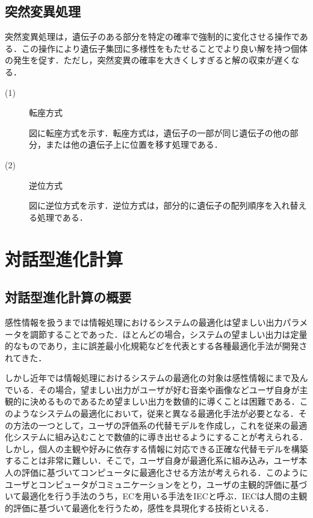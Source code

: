 \newpage


\subsection{突然変異処理}
\label{sec2.1.5}

突然変異処理は，遺伝子のある部分を特定の確率で強制的に変化させる操作である．この操作により遺伝子集団に多様性をもたせることでより良い解を持つ個体の発生を促す．ただし，突然変異の確率を大きくしすぎると解の収束が遅くなる．

\begin{description}

\item[ (1) ]転座方式

図に転座方式を示す．転座方式は，遺伝子の一部が同じ遺伝子の他の部分，または他の遺伝子上に位置を移す処理である．

\item[ (2) ]逆位方式


図に逆位方式を示す．逆位方式は，部分的に遺伝子の配列順序を入れ替える処理である．


\end{description}


\newpage

\section{対話型進化計算}
\label{sec2.2}

\subsection{対話型進化計算の概要}
\label{sec2.2.1}

感性情報を扱うまでは情報処理におけるシステムの最適化は望ましい出力パラメータを調節することであった．ほとんどの場合，システムの望ましい出力は定量的なものであり，主に誤差最小化規範などを代表とする各種最適化手法が開発されてきた．

しかし近年では情報処理におけるシステムの最適化の対象は感性情報にまで及んでいる．その場合，望ましい出力がユーザが好む音楽や画像などユーザ自身が主観的に決めるものであるため望ましい出力を数値的に導くことは困難である．このようなシステムの最適化において，従来と異なる最適化手法が必要となる．その方法の一つとして，ユーザの評価系の代替モデルを作成し，これを従来の最適化システムに組み込むことで数値的に導き出せるようにすることが考えられる．しかし，個人の主観や好みに依存する情報に対応できる正確な代替モデルを構築することは非常に難しい．そこで，ユーザ自身が最適化系に組み込み，ユーザ本人の評価に基づいてコンピュータに最適化させる方法が考えられる．このようにユーザとコンピュータがコミュニケーションをとり，ユーザの主観的評価に基づいて最適化を行う手法のうち，ECを用いる手法をIECと呼ぶ．IECは人間の主観的評価に基づいて最適化を行うため，感性を具現化する技術といえる．


